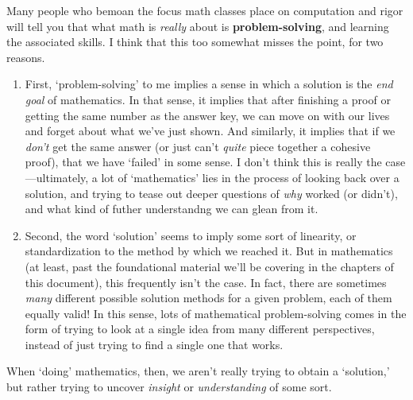 \documentclass[10pt]{article}
\theoremstyle{definition}
\begin{document}
Many people who bemoan the focus math classes place on computation and rigor will tell you that what math is \emph{really} about is \textbf{problem-solving}, and learning the associated skills.  I think that this too somewhat misses the point, for two reasons.
\begin{enumerate}
\item First, `problem-solving' to me implies a sense in which a solution is the \emph{end goal} of mathematics.  In that sense, it implies that after finishing a proof or getting the same number as the answer key, we can move on with our lives and forget about what we've just shown.  And similarly, it implies that if we \emph{don't} get the same answer (or just can't \emph{quite} piece together a cohesive proof), that we have `failed' in some sense.  I don't think this is really the case---ultimately, a lot of `mathematics' lies in the process of looking back over a solution, and trying to tease out deeper questions of \emph{why} worked (or didn't), and what kind of futher understandng we can glean from it.
\item Second, the word `solution' seems to imply some sort of linearity, or standardization to the method by which we reached it.  But in mathematics (at least, past the foundational material we'll be covering in the chapters of this document), this frequently isn't the case.  In fact, there are sometimes \emph{many} different possible solution methods for a given problem, each of them equally valid!  In this sense, lots of mathematical problem-solving comes in the form of trying to look at a single idea from many different perspectives, instead of just trying to find a single one that works.
\end{enumerate}
When `doing' mathematics, then, we aren't really trying to obtain a `solution,' but rather trying to uncover \emph{insight} or \emph{understanding} of some sort.
\end{document}

